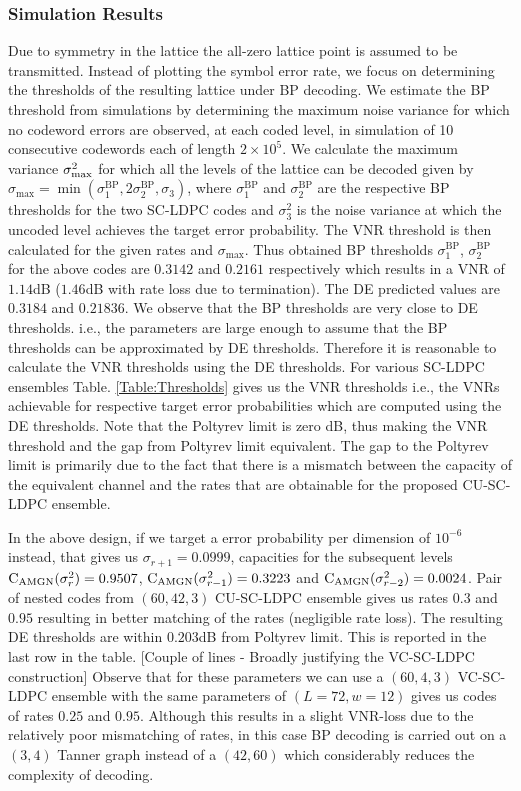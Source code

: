 \documentclass[journal,twocolumn]{IEEEtran}
\begin{document}
\subsubsection*{Simulation Results}
Due to symmetry in the lattice the all-zero lattice point is assumed to be transmitted. Instead of plotting the symbol error rate, we focus on determining the thresholds of the resulting lattice under BP decoding. We estimate the BP threshold from simulations by determining the maximum noise variance for which no codeword errors are observed, at each coded level, in simulation of 10 consecutive codewords each of length $2\times 10^{5}$. We calculate the maximum variance $\sigma_{\text{max}}^{2}$ for which all the levels of the lattice can be decoded given by $\sigma_{\text{max}}=\min(\sigma_{1}^{\text{BP}},2\sigma_{2}^{\text{BP}},\sigma_{3})$, where $\sigma_{1}^{\text{BP}}$ and $\sigma_{2}^{\text{BP}}$ are the respective BP thresholds for the two SC-LDPC codes and $\sigma_{3}^{2}$ is the noise variance at which the uncoded level achieves the target error probability. The VNR threshold is then calculated for the given rates and $\sigma_{\text{max}}$. Thus obtained BP thresholds $\sigma_{1}^{\text{BP}}$, $\sigma_{2}^{\text{BP}}$ for the above codes are $0.3142$ and $0.2161$ respectively which results in a VNR of $1.14$dB ($1.46$dB with rate loss due to termination). The DE predicted values are $0.3184$ and $0.21836$. We observe that the BP thresholds are very close to DE thresholds. i.e., the parameters are large enough to assume that the BP thresholds can be approximated by DE thresholds. Therefore it is reasonable to calculate the VNR thresholds using the DE thresholds. For various SC-LDPC ensembles Table. \ref{Table:Thresholds} gives us the VNR thresholds i.e., the VNRs achievable for respective target error probabilities which are computed using the DE thresholds. Note that the Poltyrev limit is zero dB, thus making the VNR threshold and the gap from Poltyrev limit equivalent. The gap to the Poltyrev limit is primarily due to the fact that there is a mismatch between the capacity of the equivalent channel and the rates that are obtainable for the proposed CU-SC-LDPC ensemble.  

In the above design, if we target a error probability per dimension of $10^{-6}$  instead, that gives us $\sigma_{r+1}= 0.0999$, capacities for the subsequent levels $\text{C}_{\text{AMGN}}(\sigma^{2}_{r})=0.9507$, $\text{C}_{\text{AMGN}}(\sigma^{2}_{r-1})=0.3223$ and $\text{C}_{\text{AMGN}}(\sigma^{2}_{r-2})=0.0024$. Pair of nested codes from $(60,42,3)$ CU-SC-LDPC ensemble gives us rates $0.3$ and $0.95$ resulting in better matching of the rates (negligible rate loss). The resulting DE thresholds are within $0.203$dB from Poltyrev limit. This is reported in the last row in the table. [Couple of lines - Broadly justifying the VC-SC-LDPC construction] Observe that for these parameters we can use a $(60,4,3)$ VC-SC-LDPC ensemble with the same parameters of $(L=72,w=12)$ gives us codes of rates $0.25$ and $0.95$. Although this results in a slight VNR-loss due to the relatively poor mismatching of rates, in this case BP decoding is carried out on a $(3,4)$ Tanner graph instead of a $(42,60)$ which considerably reduces the complexity of decoding.
\end{document}
